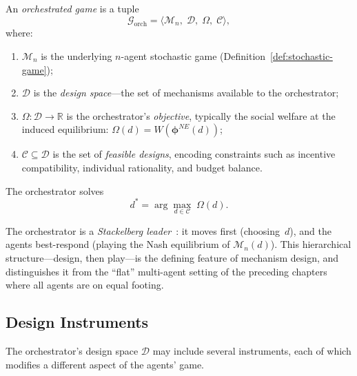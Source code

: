 \begin{definition}\label{def:orchestrated-game}
An \emph{orchestrated game} is a tuple
\begin{equation}\label{eq:orchestrated-game}
  \mathcal{G}_{\mathrm{orch}} = \langle \mathcal{M}_n,\; \mathcal{D},\; \Omega,\; \mathcal{C} \rangle,
\end{equation}
where:
\begin{enumerate}[label=(\roman*)]
  \item $\mathcal{M}_n$ is the underlying $n$-agent stochastic game (Definition~\ref{def:stochastic-game});
  \item $\mathcal{D}$ is the \emph{design space}---the set of mechanisms available to the orchestrator;
  \item $\Omega\colon \mathcal{D} \to \mathbb{R}$ is the orchestrator's \emph{objective}, typically the social welfare at the induced equilibrium: $\Omega(d) = W(\bm{\phi}^{NE}(d))$;
  \item $\mathcal{C} \subseteq \mathcal{D}$ is the set of \emph{feasible designs}, encoding constraints such as incentive compatibility, individual rationality, and budget balance.
\end{enumerate}
The orchestrator solves
\begin{equation}\label{eq:orchestrator-problem}
  d^* = \arg\max_{d \in \mathcal{C}} \;\Omega(d).
\end{equation}
\end{definition}

The orchestrator is a \emph{Stackelberg leader}~\cite{vonStackelberg1934}: it moves first (choosing~$d$), and the agents best-respond (playing the Nash equilibrium of $\mathcal{M}_n(d)$). This hierarchical structure---design, then play---is the defining feature of mechanism design, and distinguishes it from the ``flat'' multi-agent setting of the preceding chapters where all agents are on equal footing.

\subsection{Design Instruments}
\label{subsec:design-instruments}

The orchestrator's design space $\mathcal{D}$ may include several instruments, each of which modifies a different aspect of the agents' game.

